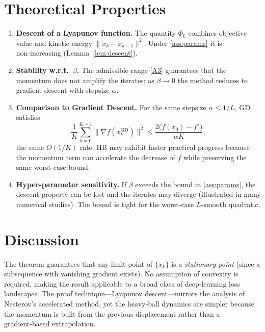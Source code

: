 \documentclass{article}
\begin{document}
\section*{Theoretical Properties}
\begin{enumerate}[label=\arabic*.]
\item \textbf{Descent of a Lyapunov function.}  The quantity $\Phi_k$ combines objective value and kinetic energy $\|x_k-x_{k-1}\|^2$. Under \ref{ass:params} it is non‑increasing (Lemma~\ref{lem:descent}).
\item \textbf{Stability w.r.t.\ $\beta$.}  The admissible range \eqref{A3} guarantees that the momentum does not amplify the iterates; as $\beta\to0$ the method reduces to gradient descent with stepsize $\alpha$.
\item \textbf{Comparison to Gradient Descent.}  For the same stepsize $\alpha\le 1/L$, GD satisfies
\[
\frac{1}{K}\sum_{k=0}^{K-1}\|\nabla f(x_k^{\text{GD}})\|^2\le\frac{2\bigl(f(x_0)-f^\star\bigr)}{\alpha K},
\]
the same $O(1/K)$ rate.  HB may exhibit faster practical progress because the momentum term can accelerate the decrease of $f$ while preserving the same worst‑case bound.
\item \textbf{Hyper‑parameter sensitivity.}  If $\beta$ exceeds the bound in \ref{ass:params}, the descent property can be lost and the iterates may diverge (illustrated in many numerical studies).  The bound is tight for the worst‑case $L$‑smooth quadratic.
\end{enumerate}

\section*{Discussion}
The theorem guarantees that any limit point of $\{x_k\}$ is a \emph{stationary point} (since a subsequence with vanishing gradient exists).  No assumption of convexity is required, making the result applicable to a broad class of deep‑learning loss landscapes.  The proof technique—Lyapunov descent—mirrors the analysis of Nesterov’s accelerated method, yet the heavy‑ball dynamics are simpler because the momentum is built from the previous displacement rather than a gradient‑based extrapolation.

\end{document}
